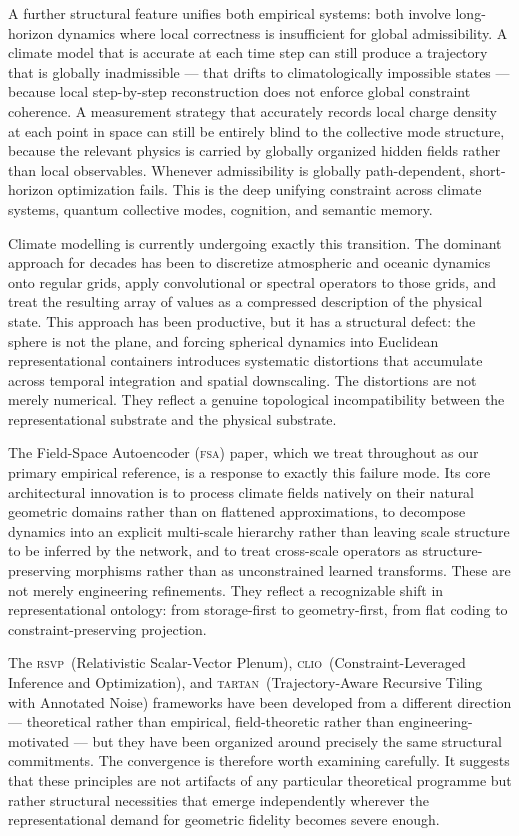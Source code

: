\documentclass[11pt,a4paper]{article}
\theoremstyle{plain}
\theoremstyle{definition}
\theoremstyle{remark}
\newcommand{\RSVP}{\textup{\textsc{rsvp}}}
\newcommand{\CLIO}{\textup{\textsc{clio}}}
\newcommand{\TARTAN}{\textup{\textsc{tartan}}}
\newcommand{\FSA}{\textup{\textsc{fsa}}}
\begin{document}
A further structural feature unifies both empirical systems: both involve
long-horizon dynamics where local correctness is insufficient for global
admissibility. A climate model that is accurate at each time step can still
produce a trajectory that is globally inadmissible --- that drifts to
climatologically impossible states --- because local step-by-step
reconstruction does not enforce global constraint coherence. A measurement
strategy that accurately records local charge density at each point in space
can still be entirely blind to the collective mode structure, because the
relevant physics is carried by globally organized hidden fields rather than
local observables. Whenever admissibility is globally path-dependent, short-horizon
optimization fails. This is the deep unifying constraint across climate
systems, quantum collective modes, cognition, and semantic memory.

Climate modelling is currently undergoing exactly this transition. The
dominant approach for decades has been to discretize atmospheric and oceanic
dynamics onto regular grids, apply convolutional or spectral operators to
those grids, and treat the resulting array of values as a compressed
description of the physical state. This approach has been productive, but
it has a structural defect: the sphere is not the plane, and forcing
spherical dynamics into Euclidean representational containers introduces
systematic distortions that accumulate across temporal integration and
spatial downscaling. The distortions are not merely numerical. They reflect
a genuine topological incompatibility between the representational substrate
and the physical substrate.

The Field-Space Autoencoder (\FSA) paper, which we treat throughout as our
primary empirical reference, is a response to exactly this failure mode.
Its core architectural innovation is to process climate fields natively on
their natural geometric domains rather than on flattened approximations, to
decompose dynamics into an explicit multi-scale hierarchy rather than
leaving scale structure to be inferred by the network, and to treat
cross-scale operators as structure-preserving morphisms rather than as
unconstrained learned transforms. These are not merely engineering
refinements. They reflect a recognizable shift in representational
ontology: from storage-first to geometry-first, from flat coding to
constraint-preserving projection.

The \RSVP\ (Relativistic Scalar-Vector Plenum), \CLIO\ (Constraint-Leveraged
Inference and Optimization), and \TARTAN\ (Trajectory-Aware Recursive
Tiling with Annotated Noise) frameworks have been developed from a
different direction --- theoretical rather than empirical, field-theoretic
rather than engineering-motivated --- but they have been organized around
precisely the same structural commitments. The convergence is therefore
worth examining carefully. It suggests that these principles are not
artifacts of any particular theoretical programme but rather structural
necessities that emerge independently wherever the representational demand
for geometric fidelity becomes severe enough.
\end{document}
